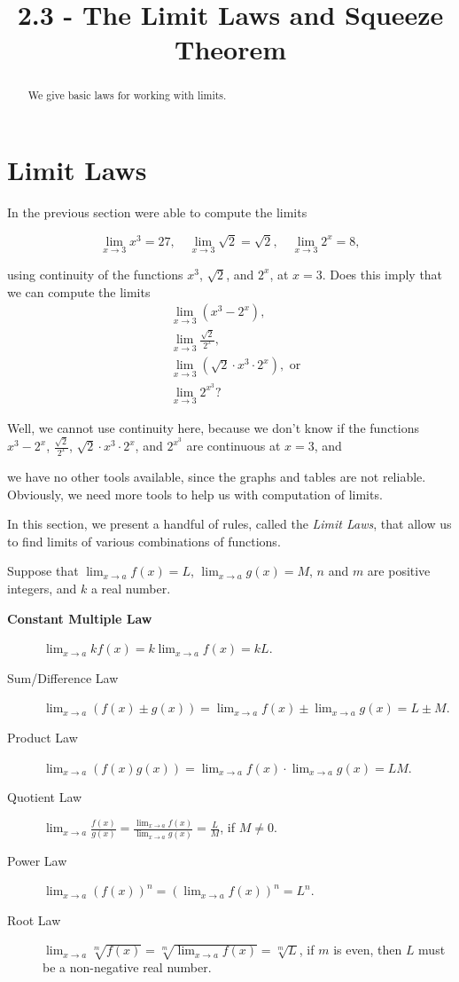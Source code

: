 \documentclass{ximera}
\title{2.3 - The Limit Laws and Squeeze Theorem}
\begin{document}
\begin{abstract}
We give basic laws for working with limits. 
\end{abstract}
\maketitle
\section{Limit Laws}
In the previous section were able to compute the limits

\[
\lim_{x\to 3} x^3=27,\quad\lim_{x\to 3} \sqrt{2}=\sqrt{2},\quad\lim_{x\to 3} 2^x=8,
\]

using continuity of the functions $x^3$, $\sqrt{2}$, and $2^x$, at $x=3$.  Does this imply that we can compute the limits
\begin{align*}
  &\lim_{x\to 3} (x^3-2^x),\\
  &\lim_{x\to 3} \frac{\sqrt{2}}{2^x},\\
  &\lim_{x\to 3} (\sqrt{2}\cdot x^3\cdot 2^x), \text{ or}\\
  &\lim_{x\to 3} 2^{x^3}?
\end{align*}

Well, we cannot use continuity here, because we don't know if the
functions $x^3-2^x$, $\frac{\sqrt{2}}{2^x}$, $\sqrt{2}\cdot
x^3\cdot 2^{x}$, and $2^{x^3}$ are continuous at $x=3$, and

 we have no other tools available, since the graphs and tables are not reliable. Obviously, we need more tools to help us with computation of limits.

 

In this section, we present a handful of rules, called the \textit{Limit Laws},
that allow us to find limits of various combinations of functions.

\begin{theorem}\label{theorem:limit-laws}
Suppose that $\lim_{x\to a}f(x)=L$, $\lim_{x\to a}g(x)=M$, $n$ and $m$ are positive integers, and $k$ a real number.
\begin{description}
\item[\textbf{Constant Multiple Law}] $\lim_{x\to a} kf(x) = k\lim_{x\to a}f(x)=kL$.
\item[Sum/Difference Law] $\lim_{x\to a} (f(x) \pm g(x)) =
  \lim_{x\to a}f(x) \pm \lim_{x\to a}g(x)=L \pm M$.
\item[Product Law]  $\lim_{x\to a} (f(x)g(x)) = \lim_{x\to
  a}f(x)\cdot\lim_{x\to a}g(x)=LM$.
\item[Quotient Law]  $\lim_{x\to a} \frac{f(x)}{g(x)} =
  \frac{\lim_{x\to a}f(x)}{\lim_{x\to a}g(x)}=\frac{L}{M}$, if
  $M\ne0$.
\item[Power Law] $\lim_{x\to a} (f(x))^n=(\lim_{x\to a} f(x))^n=L^n$.
\item[Root Law] $\lim_{x\to a} \sqrt[m]{f(x)}=\sqrt[m]{\lim_{x\to a} f(x)}=\sqrt[m]{L}$, if $m$ is even, then $L$ must be a non-negative real number.
\end{description}
\label{thm:limit laws}
\end{theorem}
\end{document}
